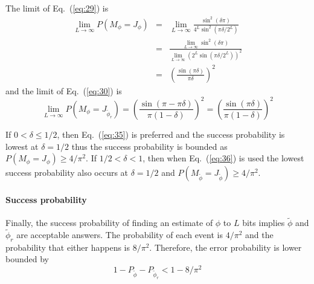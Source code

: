 \documentclass[11pt,oneside,final]{huthesis}%
\begin{document}
The limit of Eq.~(\ref{eq:29}) is
\begin{eqnarray}
	\lim_{L\rightarrow\infty}P(M_{\phi}=J_{\phi})&=& \lim_{L\rightarrow\infty}\frac{\sin^2(\delta\pi)}{4^L\sin^2\left( \pi\delta/2^L \right)}\nonumber\\
	&=&  \frac{\lim_{L\rightarrow\infty}\sin^2(\delta\pi)}{\lim_{L\rightarrow\infty}(2^L\sin\left( \pi\delta/2^L \right))^2}\nonumber\\
	&=& \left(\frac{\sin(\pi\delta)}{\pi\delta}\right)^2
	\label{eq:35}
\end{eqnarray}
and  the limit of Eq.~(\ref{eq:30}) is
\begin{equation}
	\lim_{L\rightarrow\infty}P(M_{\phi}=J_{\tilde{\phi}_r})= \left( \frac{\sin(\pi-\pi\delta)}{\pi(1-\delta)} \right)^2=\left( \frac{\sin(\pi\delta)}{\pi(1-\delta)} \right)^2
	\label{eq:36}
\end{equation}

If $0<\delta\leq1/2$, then Eq.~(\ref{eq:35}) is preferred and the success probability is lowest at $\delta=1/2$ thus the success probability is bounded as $P(M_{\phi}=J_\phi)\geq 4/\pi^2$.  If $1/2<\delta<1$, then when Eq.~(\ref{eq:36}) is used the lowest success probability also occurs at $\delta=1/2$ and $P(M_{\tilde{\phi}}=J_{\tilde{\phi}})\geq 4/\pi^2$.

\paragraph{Success probability}
Finally, the success probability of finding an estimate of $\phi$ to $L$ bits implies $\tilde{\phi}$ and $\tilde{\phi}_r$ are acceptable answers.  The probability of each event is $4/\pi^2$ and the probability that either happens is $8/\pi^2$.  Therefore, the error probability is lower bounded by
\begin{equation}
	1-P_{\tilde{\phi}}-P_{\tilde{\phi}_r}<1-8/\pi^2
	\label{eq:peaerr}
\end{equation}
\end{document}
